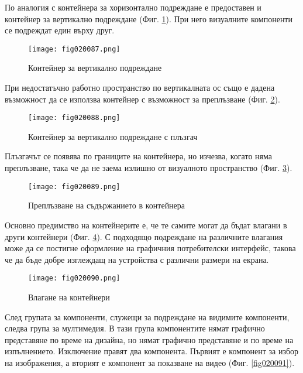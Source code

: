 По аналогия с контейнера за хоризонтално подреждане е предоставен и контейнер за вертикално подреждане (Фиг. \ref{fig020087}). При него визуалните компоненти се подреждат един върху друг.

\begin{figure}[H]
  \centering
  \texttt{[image: fig020087.png]}
  \caption{Контейнер за вертикално подреждане}
\label{fig020087}
\end{figure}

При недостатъчно работно пространство по вертикалната ос също е дадена възможност да се използва контейнер с възможност за преплъзване (Фиг. \ref{fig020088}).

\begin{figure}[H]
  \centering
  \texttt{[image: fig020088.png]}
  \caption{Контейнер за вертикално подреждане с плъзгач}
\label{fig020088}
\end{figure}

Плъзгачът се появява по границите на контейнера, но изчезва, когато няма преплъзване, така че да не заема излишно от визуалното пространство (Фиг. \ref{fig020089}).

\begin{figure}[H]
  \centering
  \texttt{[image: fig020089.png]}
  \caption{Преплъзване на съдържанието в контейнера}
\label{fig020089}
\end{figure}

Основно предимство на контейнерите е, че те самите могат да бъдат влагани в други контейнери (Фиг. \ref{fig020090}). С подходящо подреждане на различните влагания може да се постигне оформление на графичния потребителски интерфейс, такова че да бъде добре изглеждащ на устройства с различни размери на екрана.

\begin{figure}[H]
  \centering
  \texttt{[image: fig020090.png]}
  \caption{Влагане на контейнери}
\label{fig020090}
\end{figure}

След групата за компоненти, служещи за подреждане на видимите компоненти, следва група за мултимедия. В тази група компонентите нямат графично представяне по време на дизайна, но нямат графично представяне и по време на изпълнението. Изключение правят два компонента. Първият е компонент за избор на изображения, а вторият е компонент за показване на видео (Фиг. \ref{fig020091}).

